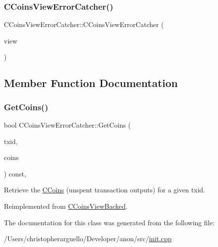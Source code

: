 \subsubsection{\texorpdfstring{C\+Coins\+View\+Error\+Catcher()}{CCoinsViewErrorCatcher()}}
{\footnotesize\ttfamily C\+Coins\+View\+Error\+Catcher\+::\+C\+Coins\+View\+Error\+Catcher (\begin{DoxyParamCaption}\item[{\mbox{\hyperlink{class_c_coins_view}{C\+Coins\+View}} $\ast$}]{view }\end{DoxyParamCaption})\hspace{0.3cm}{\ttfamily [inline]}}



\subsection{Member Function Documentation}
\mbox{\label{class_c_coins_view_error_catcher_a909f7b9e364b6f06bfea955209aa015d}} 
\subsubsection{\texorpdfstring{Get\+Coins()}{GetCoins()}}
{\footnotesize\ttfamily bool C\+Coins\+View\+Error\+Catcher\+::\+Get\+Coins (\begin{DoxyParamCaption}\item[{const \mbox{\hyperlink{classuint256}{uint256}} \&}]{txid,  }\item[{\mbox{\hyperlink{class_c_coins}{C\+Coins}} \&}]{coins }\end{DoxyParamCaption}) const\hspace{0.3cm}{\ttfamily [inline]}, {\ttfamily [virtual]}}



Retrieve the \mbox{\hyperlink{class_c_coins}{C\+Coins}} (unspent transaction outputs) for a given txid. 



Reimplemented from \mbox{\hyperlink{class_c_coins_view_backed_a456f9e85817556329a959c120998df5b}{C\+Coins\+View\+Backed}}.



The documentation for this class was generated from the following file\+:\begin{DoxyCompactItemize}
\item 
/\+Users/christopherarguello/\+Developer/anon/src/\mbox{\hyperlink{init_8cpp}{init.\+cpp}}\end{DoxyCompactItemize}
